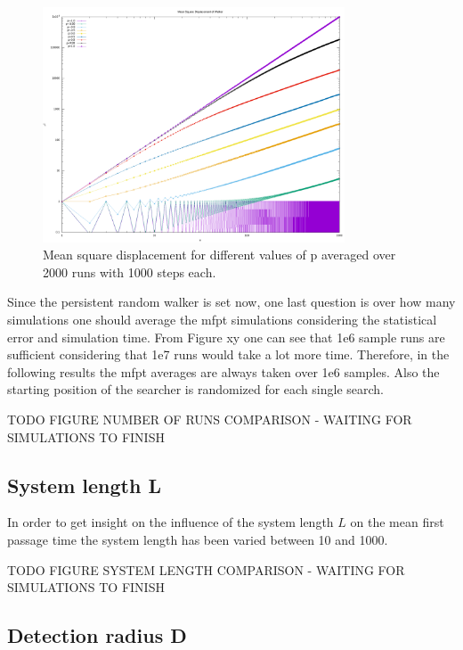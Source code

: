 \documentclass[]{scrartcl}
\begin{document}
\begin{figure}[!hbt]
 \centering
 \includegraphics[width=0.8\textwidth]{./fig/cont/prep/msd-nruns=2000-nsteps=1000.png}
 \caption{Mean square displacement for different values of p averaged over 2000 runs with 1000 steps each.}
 \label{fig:cont-prep-msd}
\end{figure}

Since the persistent random walker is set now, one last question is over how many simulations one should average the mfpt simulations considering the statistical error and simulation time. From Figure xy one can see that 1e6 sample runs are sufficient considering that 1e7 runs would take a lot more time. Therefore, in the following results the mfpt averages are always taken over 1e6 samples. Also the starting position of the searcher is randomized for each single search.

TODO FIGURE NUMBER OF RUNS COMPARISON - WAITING FOR SIMULATIONS TO FINISH

\subsection{System length L}
\label{ssec:cont-L}

In order to get insight on the influence of the system length $L$ on the mean first passage time the system length has been varied between 10 and 1000.

TODO FIGURE SYSTEM LENGTH COMPARISON - WAITING FOR SIMULATIONS TO FINISH

\subsection{Detection radius D}
\label{ssec:cont-D}
\end{document}
